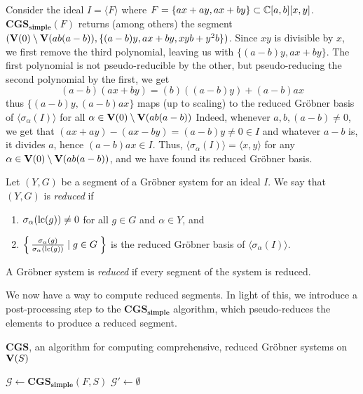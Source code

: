 \begin{example}\upshape
  Consider the ideal $I = \langle F \rangle$ where $F = \{ ax + ay, ax + by \} \subset \mathbb{C}[a, b][x, y]$. $\mathbf{CGS_{simple}}(F)$ returns (among others) the segment $(\operatorname{\mathbf V}(0) \setminus \operatorname{\mathbf V}(ab(a - b)), \{(a - b)y, ax + by, xyb + y^{2}b\})$. Since $xy$ is divisible by $x$, we first remove the third polynomial, leaving us with $\{(a - b)y, ax + by\}$. The first polynomial is not pseudo-reducible by the other, but pseudo-reducing the second polynomial by the first, we get
  \[(a - b)(ax + by) = (b)((a - b)y) + (a - b)ax\]
  thus $\{(a - b)y, (a - b)ax\}$ maps (up to scaling) to the reduced Gröbner basis of $\langle \sigma_{\alpha}(I) \rangle$ for all $\alpha \in \operatorname{\mathbf V}(0) \setminus \operatorname{\mathbf V}(ab(a - b))$ Indeed, whenever $a, b, (a - b) \neq 0$, we get that $(ax + ay) - (ax - by) = (a - b)y \neq 0 \in I$ and whatever $a - b$ is, it divides $a$, hence $(a - b)ax \in I$. Thus, $\langle \sigma_{\alpha}(I) \rangle = \langle x, y \rangle$ for any $\alpha \in \operatorname{\mathbf V}(0) \setminus \operatorname{\mathbf V}(ab(a - b))$, and we have found its reduced Gröbner basis.
\end{example}

\begin{definition}\label{def:red_grb_system}
  Let $(Y, G)$ be a segment of a Gröbner system for an ideal $I$. We say that $(Y, G)$ is \textit{reduced} if
  \begin{enumerate}
    \item $\sigma_{\alpha}(\operatorname{lc}(g)) \neq 0$ for all $g \in G$ and $\alpha \in Y$, and
    \item $\left\{\,\frac{\sigma_{\alpha}(g)}{\sigma_{\alpha}(\operatorname{lc}(g))} \mid g \in G\; \right\}$ is the reduced Gröbner basis of $\langle \sigma_{\alpha}(I) \rangle$.
  \end{enumerate}
  A Gröbner system is \textit{reduced} if every segment of the system is reduced.
\end{definition}

We now have a way to compute reduced segments. In light of this, we introduce a post-processing step to the $\mathbf{CGS_{simple}}$ algorithm, which pseudo-reduces the elements to produce a reduced segment.

\begin{algorithm}\label{alg:CGS}
  \caption{$\mathbf{CGS}$, an algorithm for computing comprehensive, reduced Gröbner systems on $\operatorname{\mathbf V}(S)$}
  $\mathcal G \gets \mathbf{CGS_{simple}}(F, S)$\;
  $\mathcal G' \gets \emptyset$\;
  \;
\end{algorithm}

